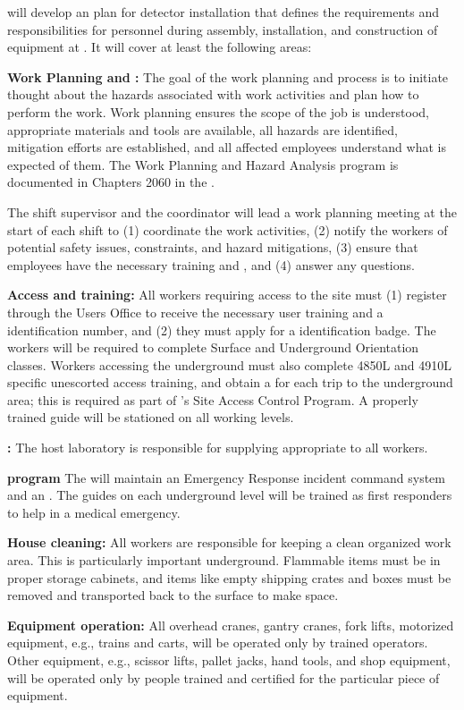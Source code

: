 will develop an   plan for detector  installation that defines  
the  requirements and responsibilities for personnel during  assembly, installation, and construction of equipment at . It will cover at least the following areas:

{\bf Work Planning and :} The goal of the work planning and  process is to initiate thought about the hazards associated with work activities and plan how to perform the work. Work planning ensures the scope of the job is understood, appropriate materials and tools are available, all hazards are identified, mitigation efforts are established, and all affected employees understand what is expected of them. 
The Work Planning and Hazard Analysis program is documented in Chapters 2060 in the .

The shift supervisor and the  coordinator  will lead a work planning meeting at the start of each shift  to (1) coordinate the work activities, (2) notify the workers of potential safety issues, constraints, and hazard mitigations, (3) ensure that employees have the necessary  training and , and (4) answer any questions.

{\bf Access and training:}  All  workers requiring access to the  site must (1) register through the  Users Office to receive the necessary user training and a  identification number, and (2) they must apply for a  identification badge. 
The workers will be required to complete  Surface and Underground Orientation classes. Workers accessing the underground must also complete 4850L and 4910L specific unescorted access training, and obtain a  for each trip to the underground area; this is required as part of 's Site Access Control Program. 
A properly trained guide will be stationed on all working levels. 

{\bf {}:} 
The host laboratory is responsible for supplying appropriate  to all workers. 

{\bf {} program} The  will maintain an Emergency Response incident command system and an .  The guides on each underground level will be trained as first responders to help in a medical emergency.
  
  
  {\bf House cleaning:} All workers are responsible for keeping a clean organized work area. This is particularly important underground. Flammable items must be in proper storage cabinets, and items like empty shipping crates and boxes must be removed and 
transported back to the surface to make space.


{\bf Equipment operation:} All overhead cranes, gantry cranes, fork lifts, motorized equipment, e.g., trains and carts, will be operated only by trained  operators. 
Other equipment, e.g., scissor lifts, pallet jacks, hand tools, and shop equipment, will be operated only by people trained
and certified for the particular piece of equipment.
